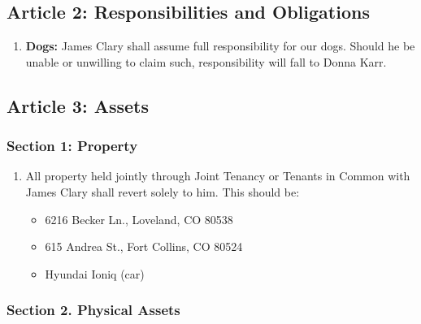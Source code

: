 \documentclass[oneside]{memoir}
\begin{document}
\subsection*{Article 2: Responsibilities and Obligations}\label{article-2-responsibilities-and-obligations}

\begin{enumerate}
\def\labelenumi{\arabic{enumi}.}
\tightlist
\item
  \textbf{Dogs:} James Clary shall assume full responsibility for our dogs. Should he be unable or unwilling to claim such, responsibility will fall to Donna Karr.
\end{enumerate}

\subsection*{Article 3: Assets}\label{article-3-assets}

\subsubsection*{Section 1: Property}\label{section-1-property}

\begin{enumerate}
\def\labelenumi{\arabic{enumi}.}
\tightlist
\item
  All property held jointly through Joint Tenancy or Tenants in Common with James Clary shall revert solely to him. This should be:

  \begin{itemize}
  \tightlist
  \item
    6216 Becker Ln., Loveland, CO 80538
  \item
    615 Andrea St., Fort Collins, CO 80524
  \item
    Hyundai Ioniq (car)
  \end{itemize}
\end{enumerate}

\subsubsection*{Section 2. Physical Assets}\label{section-2.-physical-assets}
\end{document}
